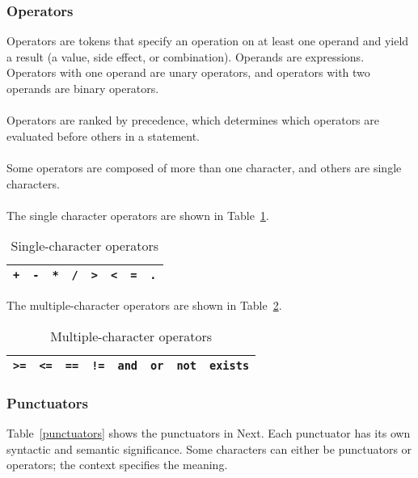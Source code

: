 \documentclass[12pt]{article}
\begin{document}
\subsubsection{Operators}
Operators are tokens that specify an operation on at least one operand and yield a result (a value, side effect, or combination).  Operands are expressions.  Operators with one operand are unary operators, and operators with two operands are binary operators.
\\
\\
\noindent Operators are ranked by precedence, which determines which operators are evaluated before others in a statement.
\\
\\
\noindent Some operators are composed of more than one character, and others are single characters.
\\
\\
\noindent The single character operators are shown in Table~\ref{single_operators}.

\begin{table}[htdp]
\caption{Single-character operators}
\begin{center}
\begin{tabular}{|c|c|c|c|c|c|c|c|}
\hline
\texttt{+} & \texttt{-} & \texttt{*} & \texttt{/}  & \texttt{>} & \texttt{<} & \texttt{=} & \texttt{.}  \\
\hline
\end{tabular}
\end{center}
\label{single_operators}
\end{table}%


\noindent The multiple-character operators are shown in Table~\ref{multi_operators}.

\begin{table}[htdp]
\caption{Multiple-character operators}
\begin{center}
\begin{tabular}{|c|c|c|c|c|c|c|c|}
\hline
\texttt{>=} & \texttt{<=} & \texttt{==} & \texttt{!=} & \texttt{and} & \texttt{or} & \texttt{not} & \texttt{exists}\\
\hline
\end{tabular}
\end{center}
\label{multi_operators}
\end{table}%

\subsubsection{Punctuators}
Table~\ref{punctuators} shows the punctuators in Next.  Each punctuator has its own syntactic and semantic significance.  Some characters can either be punctuators or operators; the context specifies the meaning.
\end{document}
